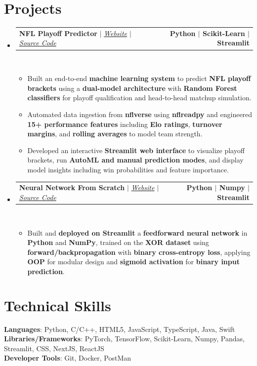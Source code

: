 \documentclass[letterpaper,11pt]{article}
\makeatletter
\newcommand{\resumeItem}[1]{
  \item\small{
    {#1 \vspace{0pt}}
  }
}
\newcommand{\resumeProjectHeading}[2]{
    \item
    \begin{tabular*}{1.001\textwidth}{l@{\extracolsep{\fill}}r}
      \small#1 & \textbf{\small #2}\\
    \end{tabular*}\vspace{-7pt}
}
\newcommand{\resumeSubHeadingListStart}{\begin{itemize}[leftmargin=0.0in, label={}]}
\newcommand{\resumeSubHeadingListEnd}{\end{itemize}}\vspace{0pt}
\newcommand{\resumeItemListStart}{\begin{itemize}}
\newcommand{\resumeItemListEnd}{\end{itemize}\vspace{-5pt}}
\makeatother
\begin{document}
\section{Projects} 
    \vspace{-5pt}
    \resumeSubHeadingListStart
    \resumeProjectHeading
        {\textbf{NFL Playoff Predictor} $|$ \emph{\href{https://nfl-predictor28.streamlit.app}{Website} $|$ \href{https://github.com/TejasNaik24/NFL-Predictor}{Source Code}}}{Python $|$ Scikit-Learn $|$ Streamlit}
    \\[5mm]
        \resumeItemListStart
            \resumeItem{Built an end-to-end \textbf{machine learning system} to predict \textbf{NFL playoff brackets} using a \textbf{dual-model architecture} with \textbf{Random Forest classifiers} for playoff qualification and head-to-head matchup simulation.}
            \resumeItem{Automated data ingestion from \textbf{nflverse} using \textbf{nflreadpy} and engineered \textbf{15+ performance features} including \textbf{Elo ratings}, \textbf{turnover margins}, and \textbf{rolling averages} to model team strength.}
            \resumeItem{Developed an interactive \textbf{Streamlit web interface} to visualize playoff brackets, run \textbf{AutoML and manual prediction modes}, and display model insights including win probabilities and feature importance.}
        \resumeItemListEnd
    \vspace{-17pt}
    \resumeProjectHeading
        {\textbf{{Neural Network From Scratch}} $|$ \emph{\href{https://neural-network-from-scratch.streamlit.app/}{Website}{ $|$ }\href{https://github.com/TejasNaik24/NeuralNetwork-From-Scratch}{Source Code}}}{Python $|$ Numpy $|$ Streamlit}
    \\[5mm]
        \resumeItemListStart
            \resumeItem{Built and \textbf{deployed on Streamlit} a \textbf{feedforward neural network} in \textbf{Python} and \textbf{NumPy}, trained on the \textbf{XOR dataset} using \textbf{forward/backpropagation} with \textbf{binary cross-entropy loss}, applying \textbf{OOP} for modular design and \textbf{sigmoid activation} for \textbf{binary input prediction}.}
        \resumeItemListEnd
    \resumeSubHeadingListEnd
\vspace{-17pt}
\section{Technical Skills}
 \begin{itemize}[leftmargin=0.15in, label={}]
    \small{\item{   
     \textbf{Languages}{: Python, C/C++, HTML5, JavaScript, TypeScript, Java, Swift} \\[1mm]
     \textbf{Libraries/Frameworks}{: PyTorch, TensorFlow, Scikit-Learn, Numpy, Pandas, Streamlit, CSS, NextJS, ReactJS} \\ [1mm]
     \textbf{Developer Tools}{: Git, Docker, PostMan} \\[1mm]

    }}
 \end{itemize}
 \vspace{-16pt}
 \vspace{3pt}
\vspace{10pt}

\vspace{-15pt}
\end{document}
